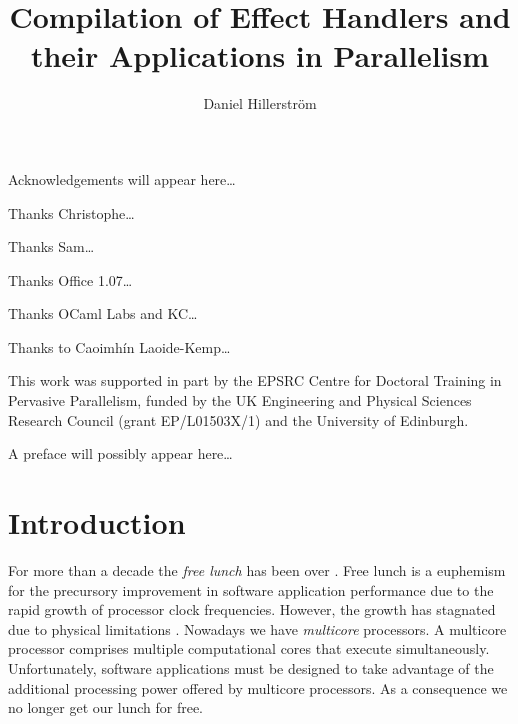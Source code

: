 \documentclass[mscres,cdtppar,twoside,openright,logo,rightchapter,normalheadings]{infthesis}
\title{Compilation of Effect Handlers and their Applications in Parallelism}
\author{Daniel Hillerström}
\theoremstyle{definition}
\begin{document}
\raggedbottom
\begin{preliminary}

\maketitle

\begin{acknowledgements}
Acknowledgements will appear here\dots

Thanks Christophe\dots

Thanks Sam\dots

Thanks Office 1.07\dots

Thanks OCaml Labs and KC\dots

Thanks to Caoimhín Laoide-Kemp\dots

This work was supported in part by the EPSRC Centre for Doctoral Training in Pervasive Parallelism, funded by the UK Engineering and Physical Sciences Research Council (grant EP/L01503X/1) and the University of Edinburgh.
\end{acknowledgements}

\standarddeclaration


\begin{preface}
A preface will possibly appear here\dots
\end{preface}

\setcounter{secnumdepth}{2} %
\setcounter{tocdepth}{3} %
\tableofcontents

\end{preliminary}


\chapter{Introduction}
\label{ch:introduction}

For more than a decade the \emph{free lunch} has been over
\citep{Sutter2005}. Free lunch is a euphemism for the precursory
improvement in software application performance due to the rapid
growth of processor clock frequencies. However, the growth has
stagnated due to physical limitations \citep{Sutter2005}.
%
Nowadays we have \emph{multicore} processors. A multicore processor
comprises multiple computational cores that execute
simultaneously. Unfortunately, software applications must be designed
to take advantage of the additional processing power offered by
multicore processors. As a consequence we no longer get our lunch for
free.
\end{document}
